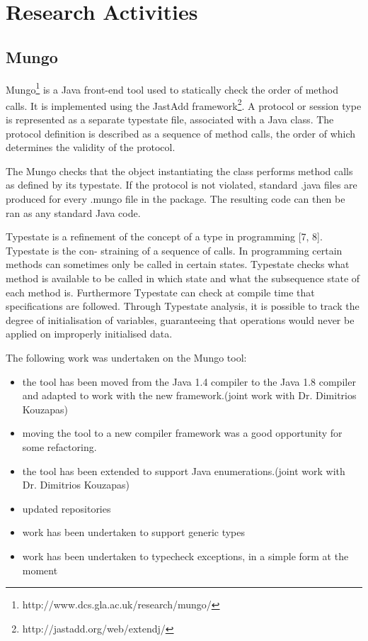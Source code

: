 \section{Research Activities}
\label{sec:Research}

\subsection{Mungo}
\label{sub:Mungo}
Mungo\footnote{http://www.dcs.gla.ac.uk/research/mungo/} is a Java front-end tool used to statically check the order of method calls. It is implemented using the JastAdd framework\footnote{http://jastadd.org/web/extendj/}. A protocol or session type is represented as a separate typestate file, associated with a Java class.  The protocol definition is described as a sequence of method calls, the order of which determines the validity of the protocol.

The Mungo checks that the object instantiating the class performs method calls as defined by its typestate. If the protocol is not violated, standard .java files are produced for every .mungo file in the package.  The resulting code can then be ran as any standard Java code.

Typestate is a refinement of the concept of a type in programming [7, 8]. Typestate is the con- straining of a sequence of calls. In programming certain methods can sometimes only be called in certain states. Typestate checks what method is available to be called in which state and what the subsequence state of each method is. Furthermore Typestate can check at compile time that specifications are followed. Through Typestate analysis, it is possible to track the degree of initialisation of variables, guaranteeing that operations would never be applied on improperly initialised data.

The following work was undertaken on the Mungo tool:
\begin{itemize}
  \item the tool has been moved from the Java 1.4 compiler to the Java 1.8 compiler and adapted to work with the new framework.(joint work with Dr. Dimitrios Kouzapas)
  \item moving the tool to a new compiler framework was a good opportunity for some refactoring.
  \item the tool has been extended to support Java enumerations.(joint work with Dr. Dimitrios Kouzapas)
  \item updated repositories
  \item work has been undertaken to support generic types
  \item work has been undertaken to typecheck exceptions, in a simple form at the moment
\end{itemize}



